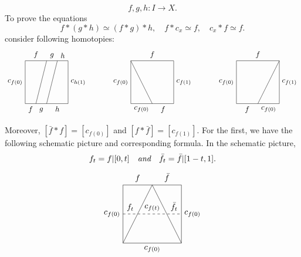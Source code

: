 \[f,g,h:I\to X.\]
To prove the equations
\[f\ast(g\ast h)\simeq (f\ast g)\ast h,\quad f\ast c_x\simeq f,\quad c_x\ast f\simeq f.\]
consider following homotopies:
\[\begin{tikzpicture}[scale=2]
\draw (0,0) rectangle (1,1);
\node[below] at (0.125,0) {$f$};
\node[below][below,yshift=-2pt] at (0.375,0) {$g$};
\node[below] at (0.75,0) {$h$};

\node[above] at (0.25,1) {$f$};
\node[above] at (0.625,1) {$g$};
\node[above] at (0.875,1) {$h$};

\node[left] at (0,0.5) {$c_{f(0)}$};
\node[right] at (1,0.5) {$c_{h(1)}$};

\draw (0.25,0)--(0.5,1)
(0.5,0)--(0.75,1);
\end{tikzpicture}\quad\quad\quad\begin{tikzpicture}[scale=2]
\draw (0,0) rectangle (1,1);
\node[below] at (0.25,0) {$c_{f(0)}$};
\node[below] at (0.75,0) {$f$};

\node[above] at (0.5,1) {$f$};

\node[left] at (0,0.5) {$c_{f(0)}$};
\node[right] at (1,0.5) {$c_{f(1)}$};

\draw (0.5,0)--(0,1);
\end{tikzpicture}\quad\quad\quad\begin{tikzpicture}[scale=2]
\draw (0,0) rectangle (1,1);
\node[below] at (0.75,0) {$c_{f(0)}$};
\node[below] at (0.25,0) {$f$};

\node[above] at (0.5,1) {$f$};

\node[left] at (0,0.5) {$c_{f(0)}$};
\node[right] at (1,0.5) {$c_{f(1)}$};

\draw (0.5,0)--(1,1);
\end{tikzpicture}\]
Moreover, $[\bar{f}\ast f]=[c_{f(0)}]$ and $[f\ast\bar{f}]=[c_{f(1)}]$. For the first, we have the following schematic picture and corresponding formula. In the schematic picture,
\[f_t=f|[0,t]\quad\textit{and}\quad \bar{f}_t=\bar{f}|[1-t, 1].\]
\[\begin{tikzpicture}[scale=2.5]
\draw (0,0) rectangle (1,1);
\node[below] at (0.5,0) {$c_{f(0)}$};

\node[above] at (0.25,1) {$f$};
\node[above] at (0.75,1) {$\bar{f}$};

\node[left] at (0,0.5) {$c_{f(0)}$};
\node[right] at (1,0.5) {$c_{f(0)}$};

\node[above] at (0.125,0.5) {$f_t$};
\node[above] at (0.875,0.5) {$\bar{f}_t$};
\node[above] at (0.5,0.5) {$c_{f(t)}$};
\draw (0,0)--(0.5,1)
(1,0)--(0.5,1);
\draw[dashed](0,0.5)--(1,0.5);
\end{tikzpicture}\]

